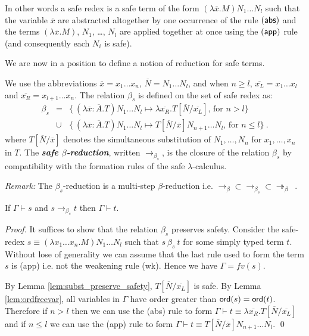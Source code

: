 \documentclass{llncs}
\newcommand\defname[1]{{\bf\em #1}\index{#1}}
\newcommand\betared{\rightarrow_\beta}
\newcommand\betasred{\rightarrow_{\beta_s}}
\newcommand\betaredtr{\twoheadrightarrow_\beta} %
\newcommand\subst[2]{\left[ #1/#2 \right]}
\newcommand\ord[1]{{\sf ord}(#1)}
\begin{document}
In other words a safe redex is a safe term of the form $(\lambda \overline{x} . M) N_1 \ldots N_l$ such that
the variable $\overline{x}$ are abstracted altogether by one occurrence of the rule $(\sf{abs})$ and the terms $(\lambda \overline{x} . M)$, $N_1$, \ldots, $N_l$ are applied together at once using the $(\sf{app})$ rule
(and consequently each $N_i$ is safe).



We are now in a position to define a notion of reduction for safe terms.

\begin{definition}
\label{dfn:safereduction} We use the
abbreviations $\overline{x} = x_1 \ldots x_n$,
$\overline{N} = N_1 \ldots N_l$, and when $n\geq l$, $\overline{x_L}
= x_1 \ldots x_l$ and $\overline{x_R} = x_{l+1} \ldots x_n$.
The relation $\beta_s$ is defined on the set of safe redex as:
\begin{eqnarray*}
\beta_s &=&
\{  \ (\lambda \overline{x} : \overline{A} . T) N_1 \ldots N_l \mapsto \lambda \overline{x_R}. T\subst{\overline{N}}{\overline{x_L}} \mbox{, for $n> l$}
\} \\
&\cup&
\{ \ (\lambda \overline{x} : \overline{A} . T) N_1 \ldots N_l \mapsto T\subst{\overline{N}}{\overline{x}} N_{n+1} \ldots N_l
\mbox{, for $n\leq l$} \} \ .
\end{eqnarray*}
where $T\subst{\overline{N}}{\overline{x}}$ denotes the simultaneous substitution of $N_1,\ldots,N_n$ for $x_1, \ldots, x_n$ in $T$.
The \defname{safe $\beta$-reduction}, written $\betasred$, is the closure of
the relation $\beta_s$ by compatibility with the formation rules of
the safe $\lambda$-calculus.
\end{definition}

\noindent \emph{Remark:} The $\beta_s$-reduction is a multi-step $\beta$-reduction i.e. $\betared \subset \betasred \subset \betaredtr$\ .


\begin{lemma}
\label{lem:safered_preserve_safety}
If $\Gamma \vdash s$ and $s \betasred t$ then $\Gamma \vdash t$.
\end{lemma}

\begin{proof}
It suffices to show that the relation $\beta_s$ preserves safety.
Consider the safe-redex $ s \equiv (\lambda x_1 \ldots x_n . M) N_1 \ldots N_l $ such that
$s\ \beta_s\ t$ for some simply typed term $t$.
Without lose of generality we can assume that the last rule used to form the term $s$ is {\sf(app)} i.e. not the weakening rule
{\sf(wk)}. Hence we have $\Gamma = fv(s)$.

By Lemma \ref{lem:subst_preserve_safety}, $T\subst{\overline{N}}{\overline{x_L}}$ is safe.
By Lemma \ref{lem:ordfreevar}, all variables in $\Gamma$ have order greater than $\ord{s} = \ord{t}$. Therefore
if $n>l$ then we can use the {\sf(abs)} rule to form $\Gamma \vdash t \equiv \lambda \overline{x_R}. T\subst{\overline{N}}{\overline{x_L}}$
and if $n \leq l$ we can use the {\sf(app)} rule to form $\Gamma \vdash t \equiv  T\subst{\overline{N}}{\overline{x}} N_{n+1} \ldots N_l$.
\qed
\end{proof}
\end{document}
